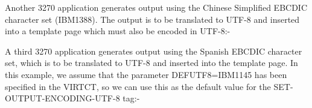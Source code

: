 \documentclass[letterpaper,10pt,english]{sphinxmanual}
\begin{document}
\begin{sphinxVerbatim}[commandchars=\\\{\}]
 
  
\end{sphinxVerbatim}

Another 3270 application generates output using the Chinese Simplified EBCDIC character set (IBM1388). The output is to be translated to UTF-8 and inserted into a template page which must also be encoded in UTF-8:-

\begin{sphinxVerbatim}[commandchars=\\\{\}]
 
  
\end{sphinxVerbatim}

A third 3270 application generates output using the Spanish EBCDIC character set, which is to be translated to UTF-8 and inserted into the template page. In this example, we assume that the parameter DEFUTF8=IBM1145 has been specified in the VIRTCT, so we can use this as the default value for the SET-OUTPUT-ENCODING-UTF-8 tag:-

\begin{sphinxVerbatim}[commandchars=\\\{\}]
 
  
\end{sphinxVerbatim}
\end{document}

